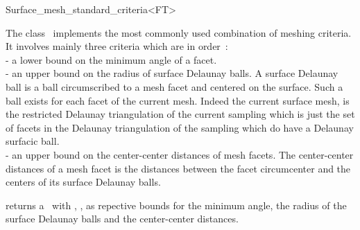 

\begin{ccRefClass}{Surface_mesh_standard_criteria<FT>}  %


\ccDefinition
  
The class \ccRefName\  implements  the most commonly used combination
of meshing criteria. It involves mainly three criteria which are
in order~: \\
- a lower bound on the minimum angle of a facet. \\
- an upper bound on the radius of surface Delaunay balls.
 A surface Delaunay ball is a  ball circumscribed to a mesh facet 
and  centered on the surface. Such a ball exists for each facet
of the current mesh.
Indeed  the current surface mesh, 
is  the restricted Delaunay triangulation of the current sampling
which is just the set of facets in the Delaunay triangulation of
the sampling  which do have a Delaunay surfacic ball. \\
- an upper bound on the center-center distances of mesh facets.
  The center-center distances of a mesh facet 
  is the distances between the facet circumcenter and the 
 centers of its  surface Delaunay balls. 



\ccIsModel




\ccCreation
{}  %

{returns a \ccRefName\ with , ,
 as repective bounds for the minimum angle,
the radius of the surface Delaunay balls 
and the center-center distances.}



\end{ccRefClass}
